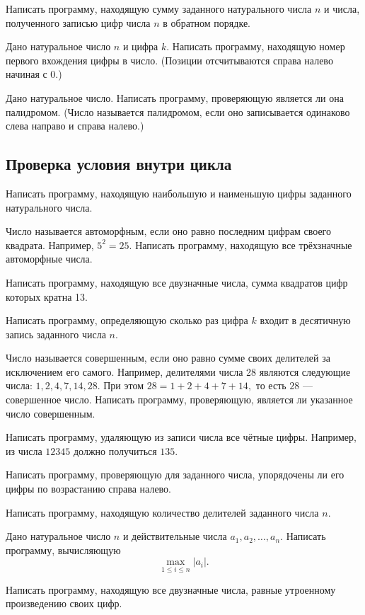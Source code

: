 \task Написать программу, находящую сумму заданного натурального числа
$n$ и числа, полученного записью цифр числа $n$ в обратном порядке.

\task Дано натуральное число $n$ и цифра $k.$ Написать программу,
находящую номер первого вхождения цифры в число. (Позиции
отсчитываются справа налево начиная с 0.)

\task Дано натуральное число. Написать программу, проверяющую является
ли она палидромом. (Число называется палидромом, если оно записывается
одинаково слева направо и справа налево.)


\subsection{Проверка условия внутри цикла}

\task Написать программу, находящую наибольшую и наименьшую цифры
заданного натурального числа.

\task Число называется автоморфным, если оно равно последним цифрам
своего квадрата. Например, $5^2=25$. Написать программу, находящую все
трёхзначные автоморфные числа.

\task Написать программу, находящую все двузначные числа, сумма
квадратов цифр которых кратна 13.

\task Написать программу, определяющую сколько раз цифра $k$ входит в
десятичную запись заданного числа $n$.

\task Число называется совершенным, если оно равно сумме своих
делителей за исключением его самого. Например, делителями числа 28
являются следующие числа: $1, 2, 4, 7, 14, 28.$ При этом $28 =
1+2+4+7+14,$ то есть $28$ — совершенное число. Написать программу,
проверяющую, является ли указанное число совершенным.

\task Написать программу, удаляющую из записи числа все чётные
цифры. Например, из числа $12345$ должно получиться $135$.

\task Написать программу, проверяющую для заданного числа, упорядочены
ли его цифры по возрастанию справа налево.

\task Написать программу, находящую количество делителей заданного
числа $n$.

\task Дано натуральное число $n$ и действительные числа $a_1, a_2,
\ldots, a_n$. Написать программу, вычисляющую
\[
\max_{1\leqslant i\leqslant n} \left|a_i\right|.
\]

\task Написать программу, находящую все двузначные числа, равные
утроенному произведению своих цифр.


